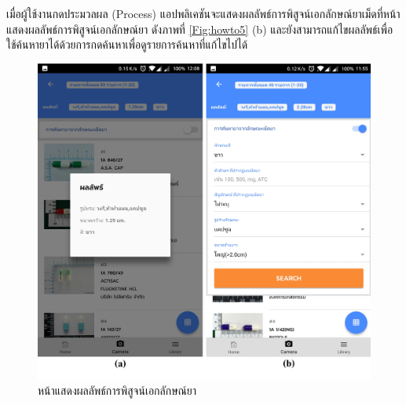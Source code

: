 เมื่อผู้ใช้งานกดประมวลผล (Process) แอปพลิเคชันจะแสดงผลลัพธ์การพิสูจน์เอกลักษณ์ยาเม็ดที่หน้าแสดงผลลัพธ์การพิสูจน์เอกลักษณ์ยา
ดังภาพที่ \ref{Fig:howto5} (b) 
และยังสามารถแก้ไขผลลัพธ์เพื่อใช้ค้นหายาได้ด้วยการกดค้นหาเพื่อดูรายการค้นหาที่แก้ไขไปได้

\begin{figure}[H]
    \includegraphics[width=\columnwidth]{Figures/7/19}
    \caption{หน้าแสดงผลลัพธ์การพิสูจน์เอกลักษณ์ยา}
    \label{Fig:howto6}
\end{figure}

